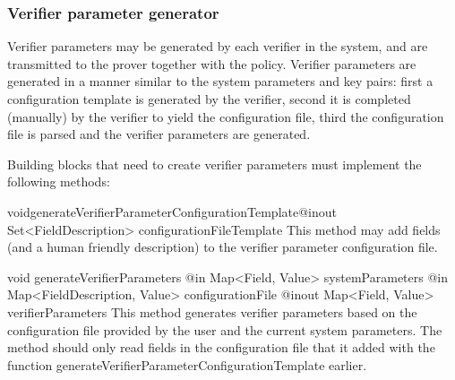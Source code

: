     \subsubsection{Verifier parameter generator}
    \label{sec:intf:verpargen}
    Verifier parameters may be generated by each verifier in the system, and are
    transmitted to the prover together with the policy.
    Verifier parameters are generated in a manner similar to the system parameters and key pairs:
    first a configuration template is generated by the verifier, second it is
    completed (manually) by the verifier to yield the configuration file, third the
    configuration file is parsed and the verifier parameters are generated.

    Building blocks that need to create verifier parameters must implement the
    following methods:
      \begin{method}{void}{generateVerifierParameterConfigurationTemplate}{{@inout Set<FieldDescription> configurationFileTemplate}}
      This method may add fields (and a human friendly description) to the verifier parameter configuration file.
      \end{method}
      \begin{method}
      {void}
      {generateVerifierParameters}
      {
        {@in Map<Field, Value> systemParameters}
        {@in Map<FieldDescription, Value> configurationFile}
        {@inout Map<Field, Value> verifierParameters}
      }
      This method generates verifier parameters based on the configuration file provided by the user and the
      current system parameters.
      The method should only read fields in the configuration file that it added with the
      function generateVerifierParameterConfigurationTemplate earlier.
      \end{method}

